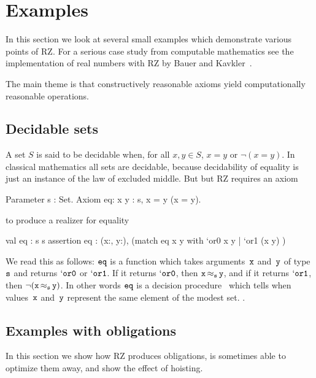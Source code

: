 \section{Examples}
\label{sec:examples}

In this section we look at several small examples which demonstrate
various points of RZ. For a serious case study from computable
mathematics see the implementation of real numbers with
RZ by Bauer and Kavkler~\cite{bauer07:_implem_rz}.

The main theme is that constructively reasonable axioms yield
computationally reasonable operations.

\subsection{Decidable sets}
\label{sec:decidable-sets}

A set $S$ is said to be decidable when, for all $x, y \in S$, $x = y$
or $\lnot (x = y)$. In classical mathematics all sets are decidable, 
\iflong
because decidability of equality is just an instance of the law of
excluded middle.  But
\else
but
\fi %
RZ requires an axiom
%
\begin{source}
Parameter s : Set.
Axiom eq: \iForall x y : s, x = y \iOr \iNot (x = y).
\end{source}
%
to produce a realizer for equality
%
\begin{source}
val eq : s \iTo s \iTo [`or0 | `or1]
assertion eq : \iForall (x:, y:), (match eq x y with
                                           `or0 \iImply x  y
                                         | `or1 \iImply \iNot (x  y) )
\end{source}
%
We read this as follows: $\f{eq}$ is a function which takes
arguments~$\f{x}$ and~$\f{y}$ of type~$\f{s}$ and returns
$\mathtt{`or0}$ or $\mathtt{`or1}$. If it returns $\mathtt{`or0}$,
then $\oper{\f{s}}{\f{x}}{\f{y}}$, and if it returns
$\mathtt{`or1}$, then $\onot{(\oper{\f{s}}{\f{x}}{\f{y}})}$. In
other words $\f{eq}$ is a decision procedure%
\iflong\ 
which tells when
values~$\f{x}$ and~$\f{y}$ represent the same element of the modest
set.
\else %
.
\fi %

\iflong
\subsection{Examples with obligations}
\label{sec:exampl-with-oblig}

In this section we show how RZ produces obligations, is sometimes able
to optimize them away, and show the effect of hoisting.

